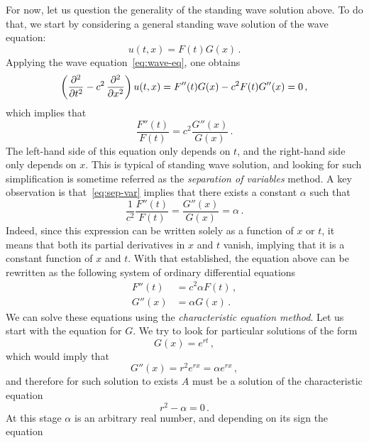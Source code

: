 For now, let us question the generality of the standing wave solution above. To do that,
we start by considering a general standing wave solution of the wave equation:
\begin{equation}
	u(t,x)=F(t)G(x)\,.
\end{equation}
Applying the wave equation~\cref{eq:wave-eq}, one obtains
\begin{equation}
	\left(\frac{\partial^{2} }{\partial t^{2}}-c^2\,\frac{\partial^{2} }{\partial x^{2}}\right)u(t,x)=F''(t)G(x)-c^2F(t)G''(x)=0\,,
\end{equation}
which implies that
\begin{equation}
	\frac{F''(t)}{F(t)}=c^2\frac{G''(x)}{G(x)}\,.\label{eq:sep-var}
\end{equation}
The left-hand side of this equation only depends on $t$, and the right-hand side only
depends on $x$. This is typical of standing wave solution, and looking for such
simplification is sometime referred as the \emph{separation of variables} method. A key
observation is that~\cref{eq:sep-var} implies that there exists a constant $\alpha$ such
that
\begin{equation}
	\frac{1}{c^2}\frac{F''(t)}{F(t)}=\frac{G''(x)}{G(x)}=\alpha\,.
\end{equation}
Indeed, since this expression can be written solely as a function of $x$ or $t$, it means
that both its partial derivatives in $x$ and $t$ vanish, implying that it is a constant
function of $x$ and $t$. With that established, the equation above can be rewritten as the
following system of ordinary differential equations
\begin{align}
	F''(t) & =c^2\alpha F(t)\,,\label{eq:sep-var-F} \\
	G''(x) & =\alpha G(x)\,.
\end{align}
We can solve these equations using the \emph{characteristic equation method}. Let us start
with the equation for $G$. We try to look for particular solutions of the form
\begin{equation}
	G(x)=e^{rt}\,,
\end{equation}
which would imply that
\begin{equation}
	G''(x)=r^2e^{rx}=\alpha e^{rx}\,,
\end{equation}
and therefore for such solution to exists $A$ must be a solution of the characteristic
equation
\begin{equation}
	r^2-\alpha=0\,.
\end{equation}
At this stage $\alpha$ is an arbitrary real number, and depending on its sign the equation
